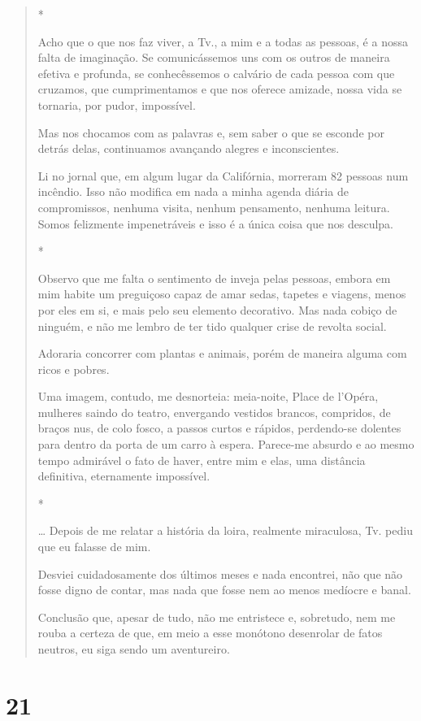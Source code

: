 \begin{quote}
*

Acho que o que nos faz viver, a Tv., a mim e a todas as pessoas, é a
nossa falta de imaginação. Se comunicássemos uns com os outros de
maneira efetiva e profunda, se conhecêssemos o calvário de cada pessoa
com que cruzamos, que cumprimentamos e que nos oferece amizade, nossa
vida se tornaria, por pudor, impossível.

Mas nos chocamos com as palavras e, sem saber o que se esconde por
detrás delas, continuamos avançando alegres e inconscientes.

Li no jornal que, em algum lugar da Califórnia, morreram 82 pessoas num
incêndio. Isso não modifica em nada a minha agenda diária de
compromissos, nenhuma visita, nenhum pensamento, nenhuma leitura. Somos
felizmente impenetráveis e isso é a única coisa que nos desculpa.

*

Observo que me falta o sentimento de inveja pelas pessoas, embora em mim
habite um preguiçoso capaz de amar sedas, tapetes e viagens, menos por
eles em si, e mais pelo seu elemento decorativo. Mas nada cobiço de
ninguém, e não me lembro de ter tido qualquer crise de revolta social.

Adoraria concorrer com plantas e animais, porém de maneira alguma com
ricos e pobres.

Uma imagem, contudo, me desnorteia: meia-noite, Place de l'Opéra,
mulheres saindo do teatro, envergando vestidos brancos, compridos, de
braços nus, de colo fosco, a passos curtos e rápidos, perdendo-se
dolentes para dentro da porta de um carro à espera. Parece-me absurdo e
ao mesmo tempo admirável o fato de haver, entre mim e elas, uma
distância definitiva, eternamente impossível.

*

\ldots{} Depois de me relatar a história da loira, realmente miraculosa,
Tv. pediu que eu falasse de mim.

Desviei cuidadosamente dos últimos meses e nada encontrei, não que não
fosse digno de contar, mas nada que fosse nem ao menos medíocre e banal.

Conclusão que, apesar de tudo, não me entristece e, sobretudo, nem me
rouba a certeza de que, em meio a esse monótono desenrolar de fatos
neutros, eu siga sendo um aventureiro.
\end{quote}

\section{21}\label{section-20}

